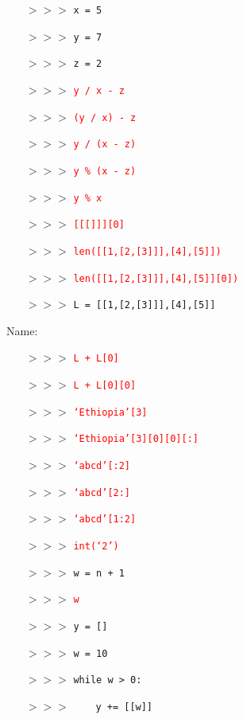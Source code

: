 \documentclass[11pt]{article}
\newcommand{\ans}[1]{\textcolor{red}{#1}}
\begin{document}
\begin{itemize}
\item[$>>>$]\texttt{x = 5}
\item[$>>>$]\texttt{y = 7}
\item[$>>>$]\texttt{z = 2}
\item[$>>>$]\ans{\texttt{y / x - z}}
\item[]
\item[$>>>$]\ans{\texttt{(y / x) - z}}
\item[]
\item[$>>>$]\ans{\texttt{y / (x - z)}}
\item[]
\item[$>>>$]\ans{\texttt{y \% (x - z)}}
\item[]
\item[$>>>$]\ans{\texttt{y \% x}}
\item[]
\item[$>>>$]\ans{\texttt{[[[]]][0]}}
\item[]
\item[$>>>$]\ans{\texttt{len([[1,[2,[3]]],[4],[5]])}}
\item[]
\item[$>>>$]\ans{\texttt{len([[1,[2,[3]]],[4],[5]][0])}}
\item[]
\item[$>>>$]\texttt{L = [[1,[2,[3]]],[4],[5]]}
\end{itemize}

\noindent Name:

\begin{itemize}
\item[$>>>$]\ans{\texttt{L + L[0]}}
\item[]
\item[$>>>$]\ans{\texttt{L + L[0][0]}}
\item[]
\item[$>>>$]\ans{\texttt{`Ethiopia'[3]}}
\item[]
\item[$>>>$]\ans{\texttt{`Ethiopia'[3][0][0][:]}}
\item[]
\item[$>>>$]\ans{\texttt{`abcd'[:2]}}
\item[]
\item[$>>>$]\ans{\texttt{`abcd'[2:]}}
\item[]
\item[$>>>$]\ans{\texttt{`abcd'[1:2]}}
\item[]
\item[$>>>$]\ans{\texttt{int(`2')}}
\item[]
\item[$>>>$] \texttt{w = n + 1}
\item[$>>>$] \ans{\texttt{w}}
\item[]
\item[$>>>$] \texttt{y = []}
\item[$>>>$] \texttt{w = 10}
\item[$>>>$] \texttt{while w > 0:}
\item[$>>>$] \ \ \ \ \texttt{y += [[w]]}
\end{itemize}
\end{document}
